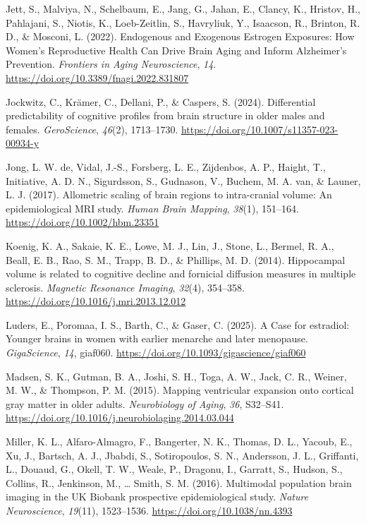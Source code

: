 \documentclass[
]{article}
\newlength{\cslhangindent}
\newenvironment{CSLReferences}[2] %
 {\begin{list}{}{%
  \setlength{\itemindent}{0pt}
  \setlength{\leftmargin}{0pt}
  \setlength{\parsep}{0pt}
  \ifodd #1
   \setlength{\leftmargin}{\cslhangindent}
   \setlength{\itemindent}{-1\cslhangindent}
  \fi
  \setlength{\itemsep}{#2\baselineskip}}}
 {\end{list}}
\begin{document}
\begin{CSLReferences}{1}{0}
Jett, S., Malviya, N., Schelbaum, E., Jang, G., Jahan, E., Clancy, K.,
Hristov, H., Pahlajani, S., Niotis, K., Loeb-Zeitlin, S., Havryliuk, Y.,
Isaacson, R., Brinton, R. D., \& Mosconi, L. (2022). Endogenous and
{Exogenous} {Estrogen} {Exposures}: {How} {Women}'s {Reproductive}
{Health} {Can} {Drive} {Brain} {Aging} and {Inform} {Alzheimer}'s
{Prevention}. \emph{Frontiers in Aging Neuroscience}, \emph{14}.
\url{https://doi.org/10.3389/fnagi.2022.831807}

Jockwitz, C., Krämer, C., Dellani, P., \& Caspers, S. (2024).
Differential predictability of cognitive profiles from brain structure
in older males and females. \emph{GeroScience}, \emph{46}(2),
1713--1730. \url{https://doi.org/10.1007/s11357-023-00934-y}

Jong, L. W. de, Vidal, J.-S., Forsberg, L. E., Zijdenbos, A. P., Haight,
T., Initiative, A. D. N., Sigurdsson, S., Gudnason, V., Buchem, M. A.
van, \& Launer, L. J. (2017). Allometric scaling of brain regions to
intra-cranial volume: {An} epidemiological {MRI} study. \emph{Human
Brain Mapping}, \emph{38}(1), 151--164.
\url{https://doi.org/10.1002/hbm.23351}

Koenig, K. A., Sakaie, K. E., Lowe, M. J., Lin, J., Stone, L., Bermel,
R. A., Beall, E. B., Rao, S. M., Trapp, B. D., \& Phillips, M. D.
(2014). Hippocampal volume is related to cognitive decline and fornicial
diffusion measures in multiple sclerosis. \emph{Magnetic Resonance
Imaging}, \emph{32}(4), 354--358.
\url{https://doi.org/10.1016/j.mri.2013.12.012}

Luders, E., Poromaa, I. S., Barth, C., \& Gaser, C. (2025). A {Case} for
estradiol: Younger brains in women with earlier menarche and later
menopause. \emph{GigaScience}, \emph{14}, giaf060.
\url{https://doi.org/10.1093/gigascience/giaf060}

Madsen, S. K., Gutman, B. A., Joshi, S. H., Toga, A. W., Jack, C. R.,
Weiner, M. W., \& Thompson, P. M. (2015). Mapping ventricular expansion
onto cortical gray matter in older adults. \emph{Neurobiology of Aging},
\emph{36}, S32--S41.
\url{https://doi.org/10.1016/j.neurobiolaging.2014.03.044}

Miller, K. L., Alfaro-Almagro, F., Bangerter, N. K., Thomas, D. L.,
Yacoub, E., Xu, J., Bartsch, A. J., Jbabdi, S., Sotiropoulos, S. N.,
Andersson, J. L., Griffanti, L., Douaud, G., Okell, T. W., Weale, P.,
Dragonu, I., Garratt, S., Hudson, S., Collins, R., Jenkinson, M.,
\ldots{} Smith, S. M. (2016). Multimodal population brain imaging in the
{UK} {Biobank} prospective epidemiological study. \emph{Nature
Neuroscience}, \emph{19}(11), 1523--1536.
\url{https://doi.org/10.1038/nn.4393}


\end{CSLReferences}
\end{document}
